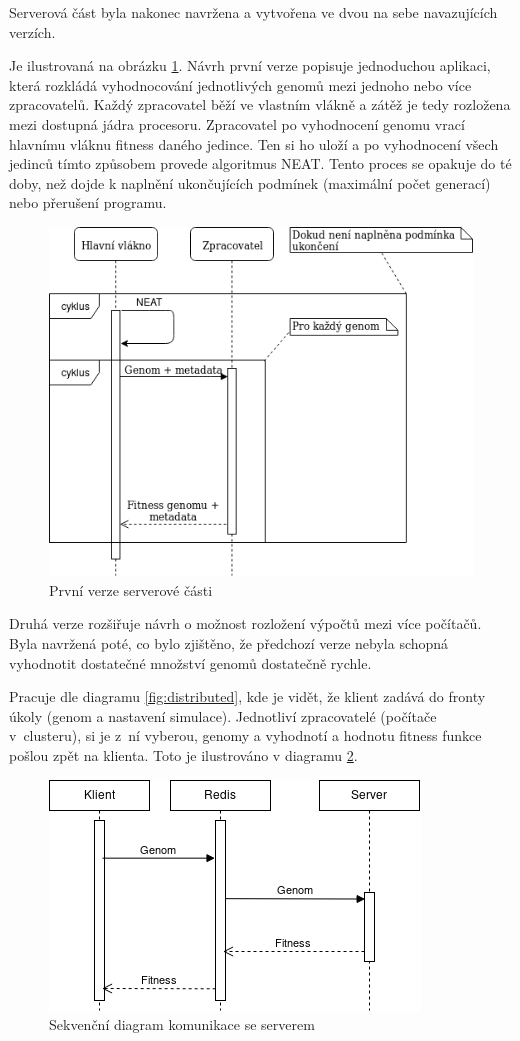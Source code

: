 Serverová část byla nakonec navržena a vytvořena ve dvou na sebe navazujících verzích. 

Je ilustrovaná na obrázku \ref{fig:server_first}. Návrh první verze popisuje jednoduchou aplikaci, která rozkládá vyhodnocování jednotlivých genomů mezi jednoho nebo více zpracovatelů. Každý zpracovatel běží ve vlastním vlákně a zátěž je tedy rozložena mezi dostupná jádra procesoru. Zpracovatel po vyhodnocení genomu vrací hlavnímu vláknu fitness daného jedince. Ten si ho uloží a po vyhodnocení všech jedinců tímto způsobem provede algoritmus NEAT. Tento proces se opakuje do té doby, než dojde k naplnění ukončujících podmínek (maximální počet generací) nebo přerušení programu.

\begin{figure}[H]
	\centering
	\includegraphics[width=0.7\linewidth]{server_first_use_case}
	\caption{První verze serverové části}
	\label{fig:server_first}
\end{figure}

Druhá verze rozšiřuje návrh o možnost rozložení výpočtů mezi více počítačů. Byla navržená poté, co bylo zjištěno, že předchozí verze nebyla schopná vyhodnotit dostatečné množství genomů dostatečně rychle.

Pracuje dle diagramu \ref{fig:distributed}, kde je vidět, že klient zadává do fronty úkoly (genom a nastavení simulace). Jednotliví zpracovatelé (počítače v~clusteru), si je z~ní vyberou, genomy a vyhodnotí a hodnotu fitness funkce pošlou zpět na klienta. Toto je ilustrováno v diagramu \ref{fig:serverusecase}. 

\begin{figure}[H]
	\centering
	\includegraphics[width=0.7\linewidth]{server_use_case}
	\caption{Sekvenční diagram komunikace se serverem}
	\label{fig:serverusecase}
\end{figure}

